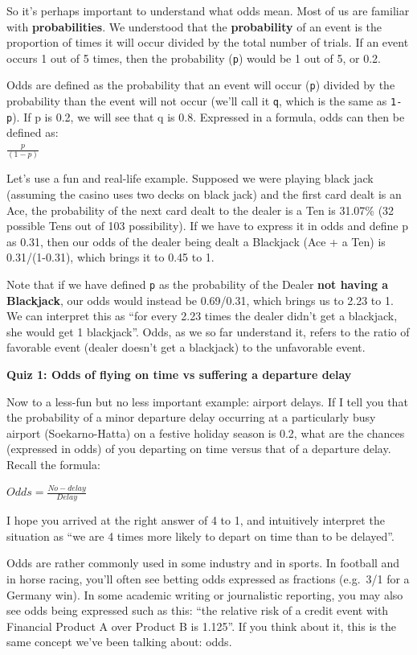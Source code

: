 \documentclass[
]{article}
\begin{document}
So it's perhaps important to understand what odds mean. Most of us are
familiar with \textbf{probabilities}. We understood that the
\textbf{probability} of an event is the proportion of times it will
occur divided by the total number of trials. If an event occurs 1 out of
5 times, then the probability (\texttt{p}) would be 1 out of 5, or 0.2.

Odds are defined as the probability that an event will occur
(\texttt{p}) divided by the probability than the event will not occur
(we'll call it \texttt{q}, which is the same as \texttt{1-p}). If p is
0.2, we will see that q is 0.8. Expressed in a formula, odds can then be
defined as:\\
\(\frac{p}{(1-p)}\)

Let's use a fun and real-life example. Supposed we were playing black
jack (assuming the casino uses two decks on black jack) and the first
card dealt is an Ace, the probability of the next card dealt to the
dealer is a Ten is 31.07\% (32 possible Tens out of 103 possibility). If
we have to express it in odds and define p as 0.31, then our odds of the
dealer being dealt a Blackjack (Ace + a Ten) is 0.31/(1-0.31), which
brings it to 0.45 to 1.

Note that if we have defined \texttt{p} as the probability of the Dealer
\textbf{not having a Blackjack}, our odds would instead be 0.69/0.31,
which brings us to 2.23 to 1. We can interpret this as ``for every 2.23
times the dealer didn't get a blackjack, she would get 1 blackjack''.
Odds, as we so far understand it, refers to the ratio of favorable event
(dealer doesn't get a blackjack) to the unfavorable event.

\textbf{Quiz 1: Odds of flying on time vs suffering a departure delay}

Now to a less-fun but no less important example: airport delays. If I
tell you that the probability of a minor departure delay occurring at a
particularly busy airport (Soekarno-Hatta) on a festive holiday season
is 0.2, what are the chances (expressed in odds) of you departing on
time versus that of a departure delay. Recall the formula:

\(Odds = \frac{No-delay}{Delay}\)

I hope you arrived at the right answer of 4 to 1, and intuitively
interpret the situation as ``we are 4 times more likely to depart on
time than to be delayed''.

Odds are rather commonly used in some industry and in sports. In
football and in horse racing, you'll often see betting odds expressed as
fractions (e.g.~3/1 for a Germany win). In some academic writing or
journalistic reporting, you may also see odds being expressed such as
this: ``the relative risk of a credit event with Financial Product A
over Product B is 1.125''. If you think about it, this is the same
concept we've been talking about: odds.
\end{document}
